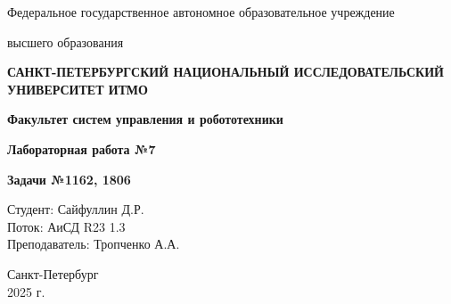 \documentclass[a4paper,12pt]{article}
\begin{document}
\begin{titlepage}
    \centering
    {\large Федеральное государственное автономное образовательное учреждение\par}
    {\large высшего образования\par}
    {\bfseries САНКТ-ПЕТЕРБУРГСКИЙ НАЦИОНАЛЬНЫЙ ИССЛЕДОВАТЕЛЬСКИЙ УНИВЕРСИТЕТ ИТМО\par}
    {\bfseries Факультет систем управления и робототехники\par}
    \vfill
    {\Large \bfseries Лабораторная работа №7\par}
    {\Large \bfseries Задачи №1162, 1806\par}
    \vfill
    
    \begin{flushright}
        Студент: Сайфуллин Д.Р. \\
        Поток: АиСД R23 1.3 \\
        Преподаватель: Тропченко А.А.
    \end{flushright}
    \vfill
    Санкт-Петербург \\
    2025 г.
\end{titlepage}
\end{document}
